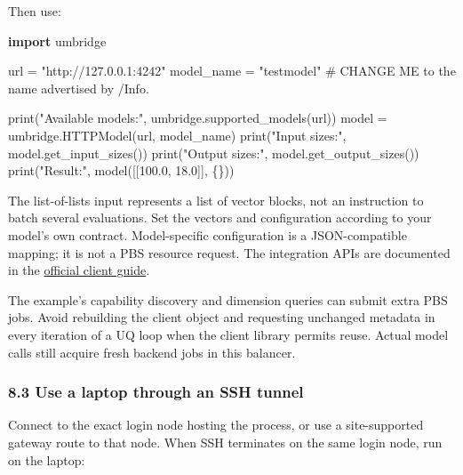 \documentclass[
  11pt,
  a4paper,
]{article}
\newenvironment{Shaded}{}{}
\newcommand{\BuiltInTok}[1]{\textcolor[rgb]{0.00,0.50,0.00}{#1}}
\newcommand{\CommentTok}[1]{\textcolor[rgb]{0.38,0.63,0.69}{\textit{#1}}}
\newcommand{\FloatTok}[1]{\textcolor[rgb]{0.25,0.63,0.44}{#1}}
\newcommand{\ImportTok}[1]{\textcolor[rgb]{0.00,0.50,0.00}{\textbf{#1}}}
\newcommand{\NormalTok}[1]{#1}
\newcommand{\OperatorTok}[1]{\textcolor[rgb]{0.40,0.40,0.40}{#1}}
\newcommand{\StringTok}[1]{\textcolor[rgb]{0.25,0.44,0.63}{#1}}
\renewenvironment{Shaded}{\begin{snugshade}}{\end{snugshade}}
\renewcommand{\CommentTok}[1]{\textcolor[rgb]{0.38,0.63,0.69}{#1}}
\begin{document}
Then use:


\begin{Shaded}
\begin{Highlighting}[]
\ImportTok{import}\NormalTok{ umbridge}

\NormalTok{url }\OperatorTok{=} \StringTok{"http://127.0.0.1:4242"}
\NormalTok{model\_name }\OperatorTok{=} \StringTok{"testmodel"}  \CommentTok{\# CHANGE ME to the name advertised by /Info.}

\BuiltInTok{print}\NormalTok{(}\StringTok{"Available models:"}\NormalTok{, umbridge.supported\_models(url))}
\NormalTok{model }\OperatorTok{=}\NormalTok{ umbridge.HTTPModel(url, model\_name)}
\BuiltInTok{print}\NormalTok{(}\StringTok{"Input sizes:"}\NormalTok{, model.get\_input\_sizes())}
\BuiltInTok{print}\NormalTok{(}\StringTok{"Output sizes:"}\NormalTok{, model.get\_output\_sizes())}
\BuiltInTok{print}\NormalTok{(}\StringTok{"Result:"}\NormalTok{, model([[}\FloatTok{100.0}\NormalTok{, }\FloatTok{18.0}\NormalTok{]], \{\}))}
\end{Highlighting}
\end{Shaded}

The list-of-lists input represents a list of vector blocks, not an
instruction to batch several evaluations. Set the vectors and
configuration according to your model's own contract. Model-specific
configuration is a JSON-compatible mapping; it is not a PBS resource
request. The integration APIs are documented in the
\href{https://um-bridge-benchmarks.readthedocs.io/en/docs/umbridge/clients.html}{official
client guide}.

The example's capability discovery and dimension queries can submit
extra PBS jobs. Avoid rebuilding the client object and requesting
unchanged metadata in every iteration of a UQ loop when the client
library permits reuse. Actual model calls still acquire fresh backend
jobs in this balancer.

\hypertarget{use-a-laptop-through-an-ssh-tunnel}{%
\subsubsection{8.3 Use a laptop through an SSH
tunnel}\label{use-a-laptop-through-an-ssh-tunnel}}

Connect to the exact login node hosting the process, or use a
site-supported gateway route to that node. When SSH terminates on the
same login node, run on the laptop:

\end{document}

